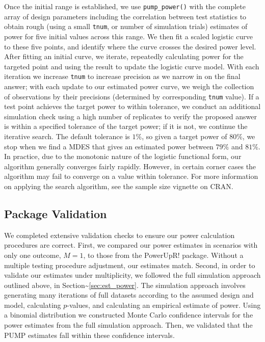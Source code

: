 \documentclass[
]{article}
\begin{document}
Once the initial range is established, we use \texttt{pump\_power()}
with the complete array of design parameters including the correlation
between test statistics to obtain rough (using a small \texttt{tnum}, or
number of simulation trials) estimates of power for five initial values
across this range. We then fit a scaled logistic curve to these five
points, and identify where the curve crosses the desired power level.
After fitting an initial curve, we iterate, repeatedly calculating power
for the targeted point and using the result to update the logistic curve
model. With each iteration we increase \texttt{tnum} to increase
precision as we narrow in on the final answer; with each update to our
estimated power curve, we weigh the collection of observations by their
precisions (determined by corresponding \texttt{tnum} value). If a test
point achieves the target power to within tolerance, we conduct an
additional simulation check using a high number of replicates to verify
the proposed answer is within a specified tolerance of the target power;
if it is not, we continue the iterative search. The default tolerance is
\(1\%\), so given a target power of \(80\%\), we stop when we find a
MDES that gives an estimated power between \(79\%\) and \(81\%\). In
practice, due to the monotonic nature of the logistic functional form,
our algorithm generally converges fairly rapidly. However, in certain
corner cases the algorithm may fail to converge on a value within
tolerance. For more information on applying the search algorithm, see
the sample size vignette on CRAN.

\subsection{Package Validation}

We completed extensive validation checks to ensure our power calculation
procedures are correct. First, we compared our power estimates in
scenarios with only one outcome, \(M = 1\), to those from the PowerUpR!
package. Without a multiple testing procedure adjustment, our estimates
match. Second, in order to validate our estimates under multiplicity, we
followed the full simulation approach outlined above, in
Section\textasciitilde{}\ref{sec:est_power}. The simulation approach
involves generating many iterations of full datasets according to the
assumed design and model, calculating \(p\)-values, and calculating an
empirical estimate of power. Using a binomial distribution we
constructed Monte Carlo confidence intervals for the power estimates
from the full simulation approach. Then, we validated that the PUMP
estimates fall within these confidence intervals.
\end{document}

